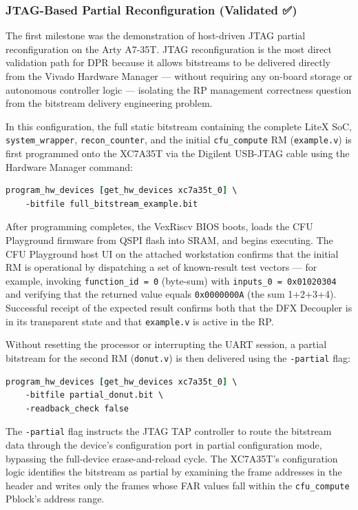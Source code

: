 \subsubsection{JTAG-Based Partial Reconfiguration (Validated ✅)}

The first milestone was the demonstration of host-driven JTAG partial reconfiguration on the Arty A7-35T. JTAG reconfiguration is the most direct validation path for DPR because it allows bitstreams to be delivered directly from the Vivado Hardware Manager — without requiring any on-board storage or autonomous controller logic — isolating the RP management correctness question from the bitstream delivery engineering problem.

In this configuration, the full static bitstream containing the complete LiteX SoC, \texttt{system\_wrapper}, \texttt{recon\_counter}, and the initial \texttt{cfu\_compute} RM (\texttt{example.v}) is first programmed onto the XC7A35T via the Digilent USB-JTAG cable using the Hardware Manager command:

\begin{lstlisting}[style=mystyle, language=tcl]
program_hw_devices [get_hw_devices xc7a35t_0] \
    -bitfile full_bitstream_example.bit
\end{lstlisting}

After programming completes, the VexRiscv BIOS boots, loads the CFU Playground firmware from QSPI flash into SRAM, and begins executing. The CFU Playground host UI on the attached workstation confirms that the initial RM is operational by dispatching a set of known-result test vectors — for example, invoking \texttt{function\_id = 0} (byte-sum) with \texttt{inputs\_0 = 0x01020304} and verifying that the returned value equals \texttt{0x0000000A} (the sum 1+2+3+4). Successful receipt of the expected result confirms both that the DFX Decoupler is in its transparent state and that \texttt{example.v} is active in the RP.

Without resetting the processor or interrupting the UART session, a partial bitstream for the second RM (\texttt{donut.v}) is then delivered using the \texttt{-partial} flag:

\begin{lstlisting}[style=mystyle, language=tcl]
program_hw_devices [get_hw_devices xc7a35t_0] \
    -bitfile partial_donut.bit \
    -readback_check false
\end{lstlisting}

The \texttt{-partial} flag instructs the JTAG TAP controller to route the bitstream data through the device's configuration port in partial configuration mode, bypassing the full-device erase-and-reload cycle. The XC7A35T's configuration logic identifies the bitstream as partial by examining the frame addresses in the header and writes only the frames whose FAR values fall within the \texttt{cfu\_compute} Pblock's address range.

